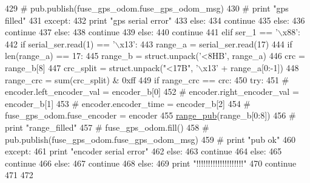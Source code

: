 \begin{DoxyCode}
429                                 \textcolor{comment}{# pub.publish(fuse\_gps\_odom.fuse\_gps\_odom\_msg)}
430                                 \textcolor{comment}{# print "gps filled"}
431                             \textcolor{keywordflow}{except}:
432                                 \textcolor{keywordflow}{print} \textcolor{stringliteral}{"gps serial error"}
433                         \textcolor{keywordflow}{else}:
434                             \textcolor{keywordflow}{continue}
435                     \textcolor{keywordflow}{else}:
436                         \textcolor{keywordflow}{continue}
437                 \textcolor{keywordflow}{else}:
438                     \textcolor{keywordflow}{continue}
439             \textcolor{keywordflow}{else}:
440                 \textcolor{keywordflow}{continue}
441         \textcolor{keywordflow}{elif} ser\_1 == \textcolor{stringliteral}{'\(\backslash\)x88'}:
442             \textcolor{keywordflow}{if} serial\_ser.read(1) == \textcolor{stringliteral}{'\(\backslash\)x13'}:
443                 range\_a = serial\_ser.read(17)
444                 \textcolor{keywordflow}{if} len(range\_a) == 17:
445                     range\_b = struct.unpack(\textcolor{stringliteral}{'<8HB'}, range\_a)
446                     crc = range\_b[8]
447                     crc\_split = struct.unpack(\textcolor{stringliteral}{"<17B"}, \textcolor{stringliteral}{'\(\backslash\)x13'} + range\_a[0:-1])
448                     range\_crc = sum(crc\_split) & 0xff
449                     \textcolor{keywordflow}{if} range\_crc == crc:
450                         \textcolor{keywordflow}{try}:
451                             \textcolor{comment}{# encoder.left\_encoder\_val = encoder\_b[0]}
452                             \textcolor{comment}{# encoder.right\_encoder\_val = encoder\_b[1]}
453                             \textcolor{comment}{# encoder.encoder\_time = encoder\_b[2]}
454                             \textcolor{comment}{# fuse\_gps\_odom.fuse\_encoder = encoder}
455                             \hyperlink{namespaceserial__af__dox_a8431825ba6486f7d2e0ddfda61a4ae5d}{range\_pub}(range\_b[0:8])
456                             \textcolor{comment}{# print "range\_filled"}
457                             \textcolor{comment}{# fuse\_gps\_odom.fill()}
458                             \textcolor{comment}{# pub.publish(fuse\_gps\_odom.fuse\_gps\_odom\_msg)}
459                             \textcolor{comment}{# print "pub ok"}
460                         \textcolor{keywordflow}{except}:
461                             \textcolor{keywordflow}{print} \textcolor{stringliteral}{"encoder serial error"}
462                     \textcolor{keywordflow}{else}:
463                         \textcolor{keywordflow}{continue}
464                 \textcolor{keywordflow}{else}:
465                     \textcolor{keywordflow}{continue}
466             \textcolor{keywordflow}{else}:
467                 \textcolor{keywordflow}{continue}
468         \textcolor{keywordflow}{else}:
469             \textcolor{keywordflow}{print} \textcolor{stringliteral}{"!!!!!!!!!!!!!!!!!!!!"}
470             \textcolor{keywordflow}{continue}
471 
472 
\end{DoxyCode}
